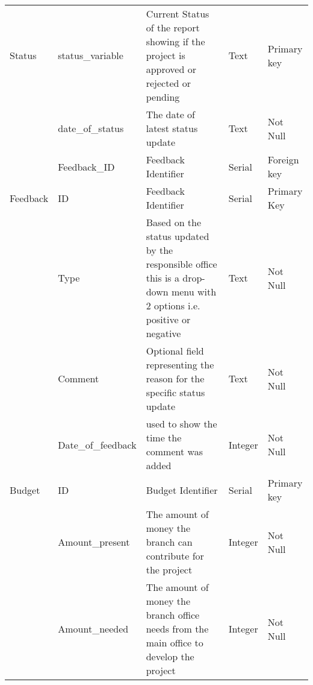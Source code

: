 \documentclass{article}
\begin{document}
\begin{longtable}{|p{}|p{} |p{}|p{}|p{} |}
Status & status\_variable & Current Status of the report showing if the project is approved or rejected or pending & Text & Primary key \\\cline{2-5}
& date\_of\_status & The date of latest status update & Text & Not Null \\\cline{2-5}
& Feedback\_ID & Feedback Identifier & Serial & Foreign key
\\\hline

Feedback & ID & Feedback Identifier & Serial & Primary Key\\\cline{2-5}
& Type & Based on the status updated by the responsible office this is a drop-down menu with 2 options i.e. positive or negative & Text & Not Null \\\cline{2-5}
& Comment & Optional field representing the reason for the specific status update & Text & Not Null\\\cline{2-5}
& Date\_of\_feedback & used to show the time the comment was added & Integer & Not Null\\\hline

Budget & ID & Budget Identifier & Serial &  Primary key\\\cline{2-5}
& Amount\_present & The amount of money the branch can contribute for the project & Integer & Not Null \\\cline{2-5}
& Amount\_needed & The amount of money the branch office needs from the main office to develop the project & Integer & Not Null\\\hline


\end{longtable}
\end{document}
